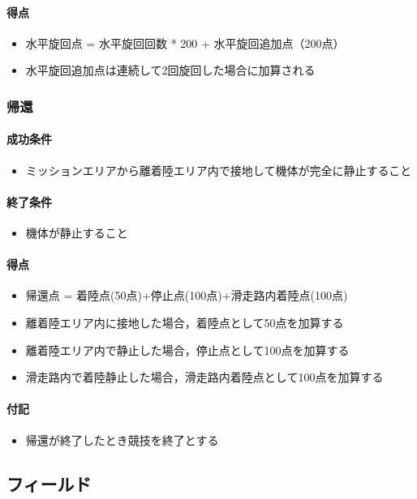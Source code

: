 \paragraph{得点}
\begin{itemize}
\item 水平旋回点 = 水平旋回回数 * 200 + 水平旋回追加点（200点）
\item 水平旋回追加点は連続して2回旋回した場合に加算される
\end{itemize}
\subsubsection{帰還}
\paragraph{成功条件}
\begin{itemize}
\item ミッションエリアから離着陸エリア内で接地して機体が完全に静止すること
\end{itemize}
\paragraph{終了条件}
\begin{itemize}
\item 機体が静止すること
\end{itemize}
\paragraph{得点}
\begin{itemize}
\item 帰還点 = 着陸点(50点)+停止点(100点)+滑走路内着陸点(100点)
\item 離着陸エリア内に接地した場合，着陸点として50点を加算する
\item 離着陸エリア内で静止した場合，停止点として100点を加算する
\item 滑走路内で着陸静止した場合，滑走路内着陸点として100点を加算する
\end{itemize}
\paragraph{付記}
\begin{itemize}
\item 帰還が終了したとき競技を終了とする
\end{itemize}

\subsection{フィールド}

